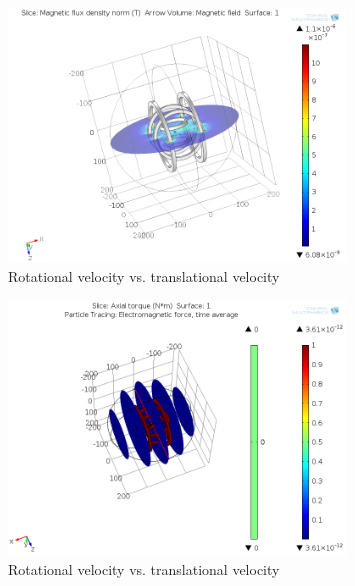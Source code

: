 \documentclass[12pt,a4paper,titlepage]{report}
\begin{document}
\begin{figure}
  \centering
    \includegraphics[width=0.80\textwidth]{magnetic_field.png}
  \caption[Rotational velocity vs. translational velocity]{Rotational velocity vs. translational velocity}
  \label{Rotational velocity vs. translational velocity}
\end{figure}



\begin{figure}
  \centering
    \includegraphics[width=0.80\textwidth]{moving_direction.png}
  \caption[Rotational velocity vs. translational velocity]{Rotational velocity vs. translational velocity}
  \label{Rotational velocity vs. translational velocity}
\end{figure}
\end{document}

